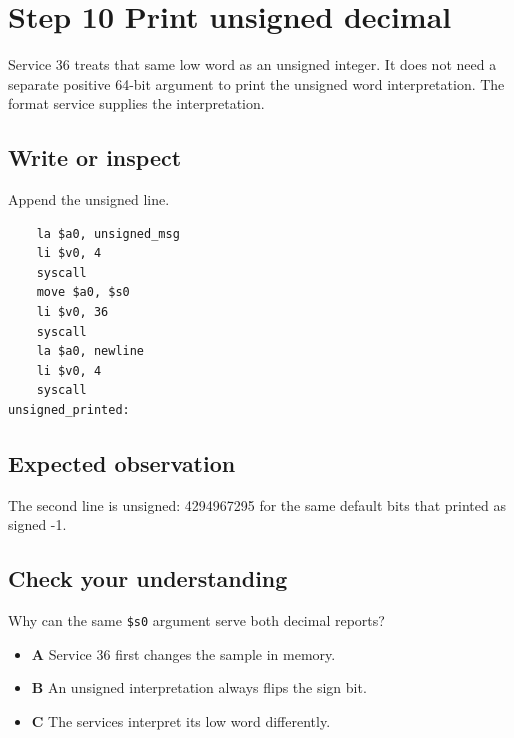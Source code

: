 \section{Step 10 Print unsigned
  decimal}\label{004-bit-inspector-s10-step-10-print-unsigned-decimal}

Service 36 treats that same low word as an unsigned integer. It does not
need a separate positive 64-bit argument to print the unsigned word
interpretation. The format service supplies the interpretation.

\subsection{Write or
  inspect}\label{004-bit-inspector-s10-write-or-inspect}

Append the unsigned line.

\begin{verbatim}
    la $a0, unsigned_msg
    li $v0, 4
    syscall
    move $a0, $s0
    li $v0, 36
    syscall
    la $a0, newline
    li $v0, 4
    syscall
unsigned_printed:
\end{verbatim}

\subsection{Expected
  observation}\label{004-bit-inspector-s10-expected-observation}

The second line is unsigned: 4294967295 for the same default bits that
printed as signed -1.

\subsection{Check your
  understanding}\label{004-bit-inspector-s10-check-your-understanding}

Why can the same \texttt{\$s0} argument serve both decimal reports?

\begin{itemize}
  \tightlist
  \item
        \textbf{A} Service 36 first changes the sample in memory.
  \item
        \textbf{B} An unsigned interpretation always flips the sign bit.
  \item
        \textbf{C} The services interpret its low word differently.
\end{itemize}
